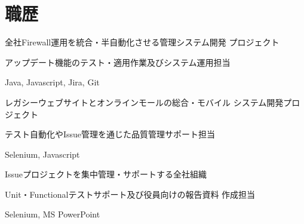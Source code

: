 \documentclass[]{deedy-resume-openfont}
\begin{document}
\begin{minipage}[t]{0.55\textwidth}

\section{職歴}
\sectionsep

\begin{tightemize}
\item 全社Firewall運用を統合・半自動化させる管理システム開発
プロジェクト
\item アップデート機能のテスト・適用作業及びシステム運用担当
\item Java, Javascript, Jira, Git
\end{tightemize}
\sectionsep

\begin{tightemize}
\item レガシーウェブサイトとオンラインモールの総合・モバイル
システム開発プロジェクト
\item テスト自動化やIssue管理を通じた品質管理サポート担当
\item Selenium, Javascript
\end{tightemize}
\sectionsep

\begin{tightemize}
\item Issueプロジェクトを集中管理・サポートする全社組織
\item Unit・Functionalテストサポート及び役員向けの報告資料
作成担当
\item Selenium, MS PowerPoint
\end{tightemize}
\sectionsep

\end{minipage} 
\end{document}
